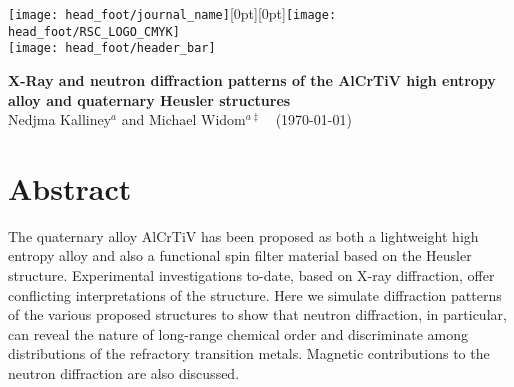 \documentclass[twoside,12pt]{article}
\begin{document}
\makeatletter 
\newlength{\figrulesep} 
\setlength{\figrulesep}{0.5\textfloatsep} 

\newcommand{\topfigrule}{\vspace*{-1pt}%
\noindent{\color{cream}\rule[-\figrulesep]{\columnwidth}{1.5pt}} }

\newcommand{\botfigrule}{\vspace*{-2pt}%
\noindent{\color{cream}\rule[\figrulesep]{\columnwidth}{1.5pt}} }

\newcommand{\dblfigrule}{\vspace*{-1pt}%
\noindent{\color{cream}\rule[-\figrulesep]{\textwidth}{1.5pt}} }

\makeatother


{\texttt{[image: head\_foot/journal\_name]}\hfill\raisebox{0pt}[0pt][0pt]{\texttt{[image: head\_foot/RSC\_LOGO\_CMYK]}}\\[1ex]
\texttt{[image: head\_foot/header\_bar]}}\par
\vspace{1em}
\sffamily

\noindent\LARGE{\textbf{X-Ray and neutron diffraction patterns of the AlCrTiV high entropy alloy and quaternary Heusler structures}} \\%

\noindent\Large{Nedjma Kalliney{$^{a}$} and Michael Widom\textit{$^{a\ddag}$}}~~(\today)\\

\section*{Abstract}
\noindent\normalsize{The quaternary alloy AlCrTiV has been proposed as both a lightweight high entropy alloy and also a functional spin filter material based on the Heusler structure. Experimental investigations to-date, based on X-ray diffraction, offer conflicting interpretations of the structure. Here we simulate diffraction patterns of the various proposed structures to show that neutron diffraction, in particular, can reveal the nature of long-range chemical order and discriminate among distributions of the refractory transition metals. Magnetic contributions to the neutron diffraction are also discussed.}
\end{document}
